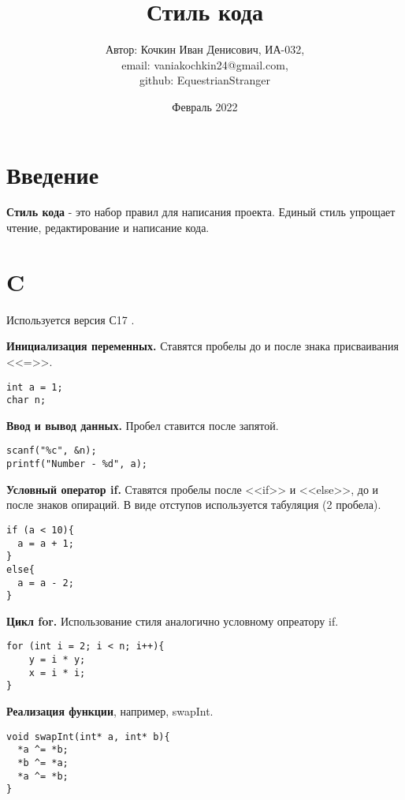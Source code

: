 \documentclass{article}
\begin{document}
\title{Стиль кода}
\author{Автор: Кочкин Иван Денисович, ИА-032,\\ email: vaniakochkin24@gmail.com,\\ github: EquestrianStranger}
\date{Февраль 2022}

\maketitle

\section{Введение}
\textbf{Стиль кода} - это набор правил для написания проекта. Единый стиль упрощает чтение, редактирование и написание кода.

\section{C}
Используется версия С17 \cite{C}.\vspace{5mm}

\textbf{Инициализация переменных.} Ставятся пробелы до и после знака присваивания <<=>>.
\begin{lstlisting}[caption=Инициализация переменных.]
int a = 1;
char n;
\end{lstlisting}

\textbf{Ввод и вывод данных.} Пробел ставится после запятой.
\begin{lstlisting}[caption=Ввод и вывод данных.]
scanf("%c", &n);
printf("Number - %d", a);
\end{lstlisting}

\textbf{Условный оператор if.} Ставятся пробелы после <<if>> и <<else>>, до и после знаков опираций. В виде отступов используется табуляция (2 пробела).
\begin{lstlisting}[caption=Условный оператор if.]
if (a < 10){
  a = a + 1;
}
else{
  a = a - 2;
}
\end{lstlisting}

\textbf{Цикл for.} Использование стиля аналогично условному опреатору if.
\begin{lstlisting}[caption=Цикл for.]
for (int i = 2; i < n; i++){
    y = i * y;
    x = i * i;
}
\end{lstlisting}

\textbf{Реализация функции}, например, swapInt.
\begin{lstlisting}[caption=Реализация функции.]
void swapInt(int* a, int* b){
  *a ^= *b;
  *b ^= *a;
  *a ^= *b;
}
\end{lstlisting}
\end{document}
